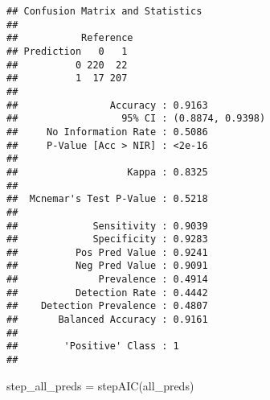 \documentclass[
]{article}
\newenvironment{Shaded}{\begin{snugshade}}{\end{snugshade}}
\newcommand{\FunctionTok}[1]{\textcolor[rgb]{0.00,0.00,0.00}{#1}}
\newcommand{\NormalTok}[1]{#1}
\newcommand{\OtherTok}[1]{\textcolor[rgb]{0.56,0.35,0.01}{#1}}
\begin{document}
\begin{verbatim}
## Confusion Matrix and Statistics
## 
##           Reference
## Prediction   0   1
##          0 220  22
##          1  17 207
##                                           
##                Accuracy : 0.9163          
##                  95% CI : (0.8874, 0.9398)
##     No Information Rate : 0.5086          
##     P-Value [Acc > NIR] : <2e-16          
##                                           
##                   Kappa : 0.8325          
##                                           
##  Mcnemar's Test P-Value : 0.5218          
##                                           
##             Sensitivity : 0.9039          
##             Specificity : 0.9283          
##          Pos Pred Value : 0.9241          
##          Neg Pred Value : 0.9091          
##              Prevalence : 0.4914          
##          Detection Rate : 0.4442          
##    Detection Prevalence : 0.4807          
##       Balanced Accuracy : 0.9161          
##                                           
##        'Positive' Class : 1               
## 
\end{verbatim}

\begin{Shaded}
\begin{Highlighting}[]
\NormalTok{step\_all\_preds }\OtherTok{=} \FunctionTok{stepAIC}\NormalTok{(all\_preds)}
\end{Highlighting}
\end{Shaded}
\end{document}
